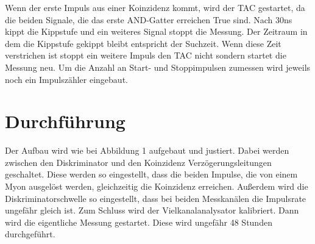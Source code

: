 Wenn der erste Impuls aus einer Koinzidenz kommt, wird der TAC gestartet, da die beiden Signale, die das erste AND-Gatter erreichen True sind.  
Nach 30ns kippt die Kippstufe und ein weiteres Signal stoppt die Messung. Der Zeitraum in dem die Kippstufe gekippt bleibt entspricht der Suchzeit. 
Wenn diese Zeit verstrichen ist stoppt ein weitere Impuls den TAC nicht sondern startet die Messung neu.
Um die Anzahl an Start- und Stoppimpulsen zumessen wird jeweils noch ein Impulszähler eingebaut.

\section{Durchführung}
Der Aufbau wird wie bei Abbildung 1 aufgebaut und justiert. Dabei werden zwischen den Diskriminator und den Koinzidenz Verzögerungsleitungen 
geschaltet. Diese werden so eingestellt, dass die beiden Impulse, die von einem Myon ausgelöst werden, 
gleichzeitig die Koinzidenz erreichen. Außerdem wird die Diskriminatorschwelle so eingestellt, dass bei beiden Messkanälen 
die Impulsrate ungefähr gleich ist. 
Zum Schluss wird der Vielkanalanalysator kalibriert. 
Dann wird die eigentliche Messung gestartet. Diese wird ungefähr 48 Stunden durchgeführt.

